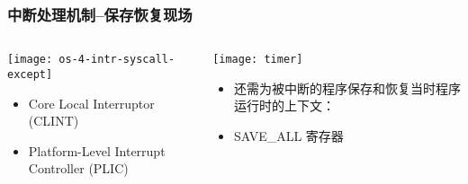 \begin{frame}[plain,t]
	\frametitle{中断处理机制--保存恢复现场}
	\begin{columns}
		
		\begin{column}{0.4\textwidth}
			\centering
			\texttt{[image: os-4-intr-syscall-except]}
			\begin{itemize} \small
				\item Core Local	Interruptor (CLINT)
				\item Platform-Level Interrupt Controller (PLIC)
			\end{itemize}
			
		\end{column}
		
		\begin{column}{0.5\textwidth}
			
			\centering
			
			\texttt{[image: timer]}
			
			\begin{itemize} \small 
				\item 还需为被中断的程序保存和恢复当时程序运行时的上下文：\pause
				\item SAVE\_ALL  \pause 寄存器 \pause
				
			\end{itemize}
			
		\end{column}
		
	\end{columns}
	
\end{frame}



